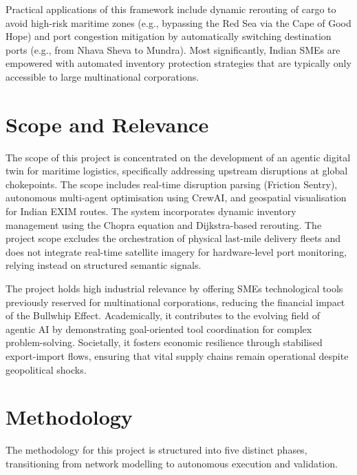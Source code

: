Practical applications of this framework include dynamic rerouting of cargo to avoid high-risk maritime zones (e.g., bypassing the Red Sea via the Cape of Good Hope) and port congestion mitigation by automatically switching destination ports (e.g., from Nhava Sheva to Mundra). Most significantly, Indian SMEs are empowered with automated inventory protection strategies that are typically only accessible to large multinational corporations.



\section[Scope and Relevance]{\textbf{Scope and Relevance}}

The scope of this project is concentrated on the development of an agentic digital twin for maritime logistics, specifically addressing upstream disruptions at global chokepoints. The scope includes real-time disruption parsing (Friction Sentry), autonomous multi-agent optimisation using CrewAI, and geospatial visualisation for Indian EXIM routes. The system incorporates dynamic inventory management using the Chopra equation and Dijkstra-based rerouting. The project scope excludes the orchestration of physical last-mile delivery fleets and does not integrate real-time satellite imagery for hardware-level port monitoring, relying instead on structured semantic signals.

The project holds high industrial relevance by offering SMEs technological tools previously reserved for multinational corporations, reducing the financial impact of the Bullwhip Effect. Academically, it contributes to the evolving field of agentic AI by demonstrating goal-oriented tool coordination for complex problem-solving. Societally, it fosters economic resilience through stabilised export-import flows, ensuring that vital supply chains remain operational despite geopolitical shocks.

\section[Methodology]{\textbf{Methodology}}
The methodology for this project is structured into five distinct phases, transitioning from network modelling to autonomous execution and validation.


